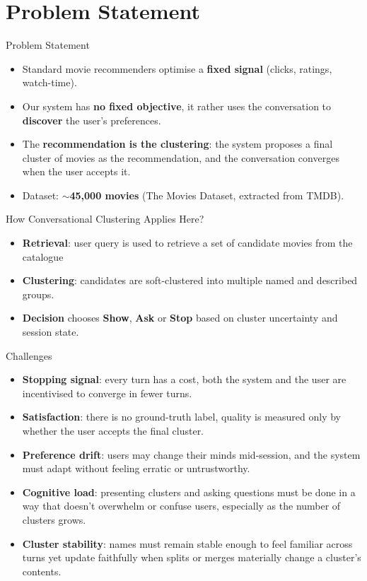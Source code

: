 \section{Problem Statement}

\begin{frame}{Problem Statement}
    \begin{itemize}
        \item Standard movie recommenders optimise a \textbf{fixed signal} (clicks, ratings, watch-time).
        \item Our system has \textbf{no fixed objective}, it rather uses the conversation to \textbf{discover} the user's preferences.
        \item The \textbf{recommendation is the clustering}: the system proposes a final cluster of movies as the recommendation, and the conversation converges when the user accepts it.
        \item Dataset: \textbf{$\sim$45,000 movies} (The Movies Dataset, extracted from TMDB).
    \end{itemize}
\end{frame}

\begin{frame}{How Conversational Clustering Applies Here?}
    \begin{itemize}
        \item \textbf{Retrieval}: user query is used to retrieve a set of candidate movies from the catalogue
        \item \textbf{Clustering}: candidates are soft-clustered into multiple named and described groups.
        \item \textbf{Decision} chooses \textbf{Show}, \textbf{Ask} or \textbf{Stop} based on cluster uncertainty and session state.
    \end{itemize}
\end{frame}

\begin{frame}{Challenges}
    \begin{itemize}
        \item \textbf{Stopping signal}: every turn has a cost, both the system and the user are incentivised to converge in fewer turns.
        \item \textbf{Satisfaction}: there is no ground-truth label, quality is measured only by whether the user accepts the final cluster.
        \item \textbf{Preference drift}: users may change their minds mid-session, and the system must adapt without feeling erratic or untrustworthy.
        \item \textbf{Cognitive load}: presenting clusters and asking questions must be done in a way that doesn't overwhelm or confuse users, especially as the number of clusters grows.
        \item \textbf{Cluster stability}: names must remain stable enough to feel familiar across turns yet update faithfully when splits or merges materially change a cluster's contents.
    \end{itemize}
\end{frame}